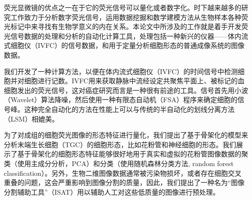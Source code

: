 
\begin{cnAbstract}

荧光显微镜的优点之一在于它的荧光信号可以量化或者数字化。时下越来越多的研究工作致力于分析数字荧光信号，运用数据挖掘和数学建模方法从生物样本各种荧光标记中来寻找有生物学意义的内在关系。本论文中所涉及的工作就是着手开发荧光信号数据的处理和分析的自动化计算工具，处理包括一种新兴的仪器——体内流式细胞仪（IVFC）的信号数据，和用于定量分析细胞形态的普通成像系统的图像数据。

我们开发了一种计算方法，以便在体内流式细胞仪（IVFC）的时间信号中检测细胞并对细胞进行记数。IVFC用来获取静脉中流经设定共聚焦平面上、被标记的血细胞发出的荧光信号，这对癌症研究而言是一种很有前途的工具。信号首先用小波（Wavelet）算法降噪，然后使用一种有限态自动机（FSA）程序来确定细胞的信号峰。这种完全自动化的方法在性能上可以与传统的半自动化的划线分离方法（LSM）相媲美。

为了对成组的细胞荧光图像的形态特征进行量化，我们提出了基于骨架化的模型来分析末端生长细胞（TGC）的细胞形态，比如花粉管和神经细胞的形态。我们展示了基于骨架化的细胞形态特征能够很好地用于真实和虚拟的花粉管图像数据的聚类（使用主成分分析，PCA）和分类（使用随机森林分类方法, random forest classification）。另外，生物二维图像数据通常被污染物损坏，或者存在细胞交叉重叠的问题，这会严重影响到图像分割的质量，因此，我们提出了一种名为“图像分割辅助工具”（ISAT）用以辅助人工对这些低质量的图像进行预处理。


\end{cnAbstract}

